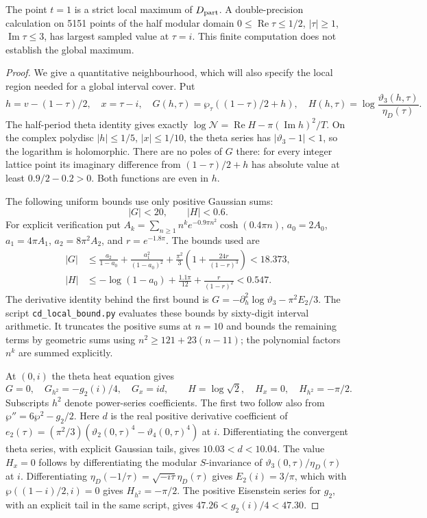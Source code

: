 \begin{proposition}\label{fam:src:C.2.2}\label{fam:st:C.2.2}
The point \(t=1\) is a strict local maximum of \(D_{\rm part}\).
A double-precision calculation on 5151 points of the half modular domain
\(0\leq\operatorname{Re}\tau\leq1/2\), \(|\tau|\geq1\),
\(\operatorname{Im}\tau\leq3\), has largest sampled value at \(\tau=i\).
This finite computation does not establish the global maximum.
\end{proposition}
\begin{proof}
We give a quantitative neighbourhood, which will also specify the local
region needed for a global interval cover. Put
\[
 h=v-(1-\tau)/2,\quad x=\tau-i,\quad
 G(h,\tau)=\wp_\tau((1-\tau)/2+h),\quad
 H(h,\tau)=\log\frac{\vartheta_3(h,\tau)}{\eta_D(\tau)}.
\]
The half-period theta identity gives exactly
$\log\mathcal N=\operatorname{Re}H-\pi(\operatorname{Im}h)^2/T$.
On the complex polydisc $|h|\leq1/5$, $|x|\leq1/10$, the theta series
has $|\vartheta_3-1|<1$, so the logarithm is holomorphic. There are no
poles of $G$ there: for every integer lattice point its imaginary
difference from $(1-\tau)/2+h$ has absolute value at least
$0.9/2-0.2>0$. Both functions are even in $h$.

The following uniform bounds use only positive Gaussian sums:
\[
 |G|<20,\qquad |H|<0.6.
\]
For explicit verification put
$A_k=\sum_{n\geq1}n^k e^{-0.9\pi n^2}\cosh(0.4\pi n)$,
$a_0=2A_0$, $a_1=4\pi A_1$, $a_2=8\pi^2A_2$, and $r=e^{-1.8\pi}$.
The bounds used are
\[
 \begin{aligned}
 |G|&\leq\frac{a_2}{1-a_0}+\frac{a_1^2}{(1-a_0)^2}
 +\frac{\pi^2}3\left(1+\frac{24r}{(1-r)^3}\right)<18.373,\\
 |H|&\leq-\log(1-a_0)+\frac{1.1\pi}{12}+
 \frac r{(1-r)^2}<0.547.
 \end{aligned}
\]
The derivative identity behind the first bound is
$G=-\partial_h^2\log\vartheta_3-\pi^2E_2/3$.
The script \texttt{cd\_local\_bound.py} evaluates these bounds by sixty-digit
interval arithmetic. It truncates the positive sums at $n=10$ and bounds
the remaining terms by geometric sums using
$n^2\geq121+23(n-11)$; the polynomial factors $n^k$ are summed explicitly.

At $(0,i)$ the theta heat equation gives
\[
 G=0,\quad G_{h^2}=-g_2(i)/4,\quad G_x=id,
 \qquad H=\log\sqrt2,\quad H_x=0,\quad H_{h^2}=-\pi/2.
\]
Subscripts $h^2$ denote power-series coefficients. The first two follow
also from $\wp''=6\wp^2-g_2/2$. Here $d$ is the real positive derivative coefficient of
$e_2(\tau)=(\pi^2/3)(\vartheta_2(0,\tau)^4-
\vartheta_4(0,\tau)^4)$ at $i$. Differentiating the convergent theta
series, with explicit Gaussian tails, gives $10.03<d<10.04$.
The value $H_x=0$ follows by differentiating the modular $S$-invariance
of $\vartheta_3(0,\tau)/\eta_D(\tau)$ at $i$. Differentiating
$\eta_D(-1/\tau)=\sqrt{-i\tau}\eta_D(\tau)$ gives $E_2(i)=3/\pi$,
which with $\wp((1-i)/2,i)=0$ gives $H_{h^2}=-\pi/2$.
The positive Eisenstein series for $g_2$, with an explicit tail in the
same script, gives $47.26<g_2(i)/4<47.30$.


\end{proof}
